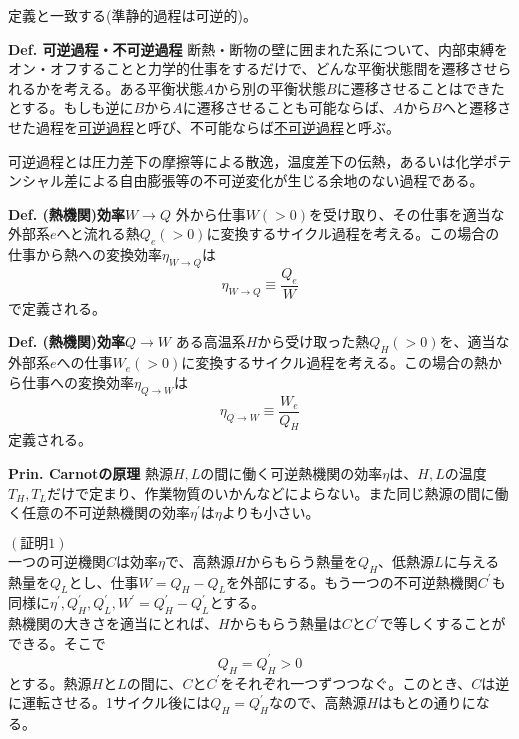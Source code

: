 \documentclass{jsarticle}
\begin{document}
定義と一致する(準静的過程は可逆的)。\\
\begin{itembox}[l]{\textbf{Def. 可逆過程・不可逆過程}}
断熱・断物の壁に囲まれた系について、内部束縛をオン・オフすることと力学的仕事をするだけで、どんな平衡状態間を遷移させられるかを考える。ある平衡状態\(A\)から別の平衡状態\(B\)に遷移させることはできたとする。もしも逆に\(B\)から\(A\)に遷移させることも可能ならば、\(A\)から\(B\)へと遷移させた過程を\underline{可逆過程}と呼び、不可能ならば\underline{不可逆過程}と呼ぶ。
\end{itembox}
可逆過程とは圧力差下の摩擦等による散逸，温度差下の伝熱，あるいは化学ポテンシャル差による自由膨張等の不可逆変化が生じる余地のない過程である。\\

\begin{itembox}[l]{\textbf{Def. (熱機関)効率\(W\to Q\)}}
外から仕事\(W(>0)\)を受け取り、その仕事を適当な外部系\(e\)へと流れる熱\(Q_{e}(>0)\)に変換するサイクル過程を考える。この場合の仕事から熱への変換効率\(\eta_{W\to Q}\)は
\[\eta_{W\to Q}\equiv \frac{Q_{e}}{W}\]
で定義される。
\end{itembox}
\begin{itembox}[l]{\textbf{Def. (熱機関)効率\(Q\to W\)}}
ある高温系\(H\)から受け取った熱\(Q_{H}(>0)\)を、適当な外部系\(e\)への仕事\(W_{e}(>0)\)に変換するサイクル過程を考える。この場合の熱から仕事への変換効率\(\eta_{Q\to W}\)は
\[\eta_{Q\to W}\equiv\frac{W_{e}}{Q_{H}}\]
定義される。
\end{itembox}
\hypertarget{Carnotの原理}{}
\begin{itembox}[l]{\textbf{Prin. Carnotの原理}}
熱源\(H,L\)の間に働く可逆熱機関の効率\(\eta\)は、\(H,L\)の温度\(T_{H},T_{L}\)だけで定まり、作業物質のいかんなどによらない。また同じ熱源の間に働く任意の不可逆熱機関の効率\(\eta^{\prime}\)は\(\eta\)よりも小さい。
\end{itembox}
\((証明1)\)\\
一つの可逆機関\(C\)は効率\(\eta\)で、高熱源\(H\)からもらう熱量を\(Q_{H}\)、低熱源\(L\)に与える熱量を\(Q_{L}\)とし、仕事\(W=Q_{H}-Q_{L}\)を外部にする。もう一つの不可逆熱機関\(C^{\prime}\)も同様に\(\eta^{\prime},Q_{H}^{\prime},Q_{L}^{\prime},W^{\prime}=Q_{H}^{\prime}-Q_{L}^{\prime}\)とする。\\
熱機関の大きさを適当にとれば、\(H\)からもらう熱量は\(C\)と\(C^{\prime}\)で等しくすることができる。そこで
\[Q_{H}=Q_{H}^{\prime}>0\]
とする。熱源\(H\)と\(L\)の間に、\(C\)と\(C^{\prime}\)をそれぞれ一つずつつなぐ。このとき、\(C\)は逆に運転させる。1サイクル後には\(Q_{H}=Q_{H}^{\prime}\)なので、高熱源\(H\)はもとの通りになる。\\
\end{document}
